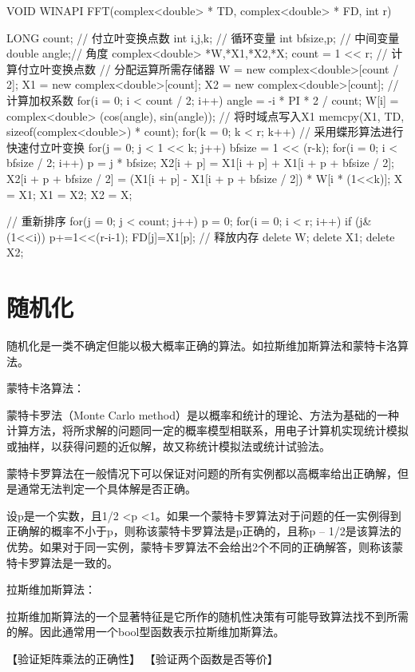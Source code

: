 \begin{Code}
	VOID WINAPI FFT(complex<double> * TD, complex<double> * FD, int r)  {  
		LONG count;  // 付立叶变换点数
		int i,j,k;  // 循环变量
		int bfsize,p;  // 中间变量  
		double angle;// 角度  
		complex<double> *W,*X1,*X2,*X;  
		count = 1 << r;  // 计算付立叶变换点数
		// 分配运算所需存储器  
		W = new complex<double>[count / 2];  
		X1 = new complex<double>[count];  
		X2 = new complex<double>[count];  
		// 计算加权系数  
		for(i = 0; i < count / 2; i++)  {  
			angle = -i * PI * 2 / count;  
			W[i] = complex<double> (cos(angle), sin(angle));  
		}  
		// 将时域点写入X1  
		memcpy(X1, TD, sizeof(complex<double>) * count);  
		for(k = 0; k < r; k++) {  // 采用蝶形算法进行快速付立叶变换 
			for(j = 0; j < 1 << k; j++)  {  
				bfsize = 1 << (r-k);  
				for(i = 0; i < bfsize / 2; i++)  {  
					p = j * bfsize;  
					X2[i + p] = X1[i + p] + X1[i + p + bfsize / 2];  
					X2[i + p + bfsize / 2] = (X1[i + p] - X1[i + p + bfsize / 2]) * W[i * (1<<k)];  
				}  
			}  
			X = X1;  
			X1 = X2;  
			X2 = X;  
		}  
		
		// 重新排序  
		for(j = 0; j < count; j++)  {  
			p = 0;  
			for(i = 0; i < r; i++)  {  
				if (j&(1<<i))  
					p+=1<<(r-i-1);  
			}  
			FD[j]=X1[p];  
		}  	
		// 释放内存  
		delete W;  
		delete X1;  
		delete X2;  
	}  
\end{Code}

\section{随机化}
随机化是一类不确定但能以极大概率正确的算法。如拉斯维加斯算法和蒙特卡洛算法。

蒙特卡洛算法：

蒙特卡罗法（Monte Carlo method）是以概率和统计的理论、方法为基础的一种计算方法，将所求解的问题同一定的概率模型相联系，用电子计算机实现统计模拟或抽样，以获得问题的近似解，故又称统计模拟法或统计试验法。

蒙特卡罗算法在一般情况下可以保证对问题的所有实例都以高概率给出正确解，但是通常无法判定一个具体解是否正确。

设p是一个实数，且1/2 <p <1。如果一个蒙特卡罗算法对于问题的任一实例得到正确解的概率不小于p，则称该蒙特卡罗算法是p正确的，且称p – 1/2是该算法的优势。如果对于同一实例，蒙特卡罗算法不会给出2个不同的正确解答，则称该蒙特卡罗算法是一致的。

拉斯维加斯算法：

拉斯维加斯算法的一个显著特征是它所作的随机性决策有可能导致算法找不到所需的解。因此通常用一个bool型函数表示拉斯维加斯算法。

【验证矩阵乘法的正确性】
【验证两个函数是否等价】